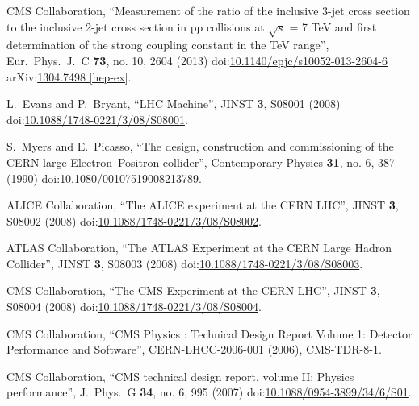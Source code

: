 \begin{thebibliography}{99}

CMS Collaboration, ``Measurement of the ratio of the inclusive 3-jet cross section to the inclusive 2-jet cross section in pp collisions at $\sqrt{s}$ = 7 TeV and first determination of the strong coupling constant in the TeV range'', Eur.\ Phys.\ J.\ C {\bf 73}, no. 10, 2604 (2013) doi:\href{http://dx.doi.org/10.1140/epjc/s10052-013-2604-6}{10.1140/epjc/s10052-013-2604-6} arXiv:\href{https://arxiv.org/abs/1304.7498}{1304.7498 [hep-ex]}.



L.~Evans and P.~Bryant, ``LHC Machine'', JINST {\bf 3}, S08001 (2008) doi:\href{http://dx.doi.org/10.1088/1748-0221/3/08/S08001}{10.1088/1748-0221/3/08/S08001}.

S.~Myers and E.~Picasso, ``The design, construction and commissioning of the CERN large Electron–Positron collider'', Contemporary Physics {\bf 31}, no. 6, 387 (1990) doi:\href{https://doi.org/10.1080/00107519008213789}{10.1080/00107519008213789}.

ALICE Collaboration, ``The ALICE experiment at the CERN LHC'', JINST {\bf 3}, S08002 (2008) doi:\href{http://dx.doi.org/10.1088/1748-0221/3/08/S08002}{10.1088/1748-0221/3/08/S08002}.

ATLAS Collaboration, ``The ATLAS Experiment at the CERN Large Hadron Collider'', JINST {\bf 3}, S08003 (2008) doi:\href{http://dx.doi.org/10.1088/1748-0221/3/08/S08003}{10.1088/1748-0221/3/08/S08003}.

CMS Collaboration, ``The CMS Experiment at the CERN LHC'', JINST {\bf 3}, S08004 (2008) doi:\href{http://dx.doi.org/10.1088/1748-0221/3/08/S08004}{10.1088/1748-0221/3/08/S08004}.

CMS Collaboration, ``CMS Physics : Technical Design Report Volume 1: Detector Performance and Software'', CERN-LHCC-2006-001 (2006), CMS-TDR-8-1. 

CMS Collaboration, ``CMS technical design report, volume II: Physics performance'', J.\ Phys.\ G {\bf 34}, no. 6, 995 (2007) doi:\href{http://dx.doi.org/10.1088/0954-3899/34/6/S01}{10.1088/0954-3899/34/6/S01}.


\end{thebibliography}
